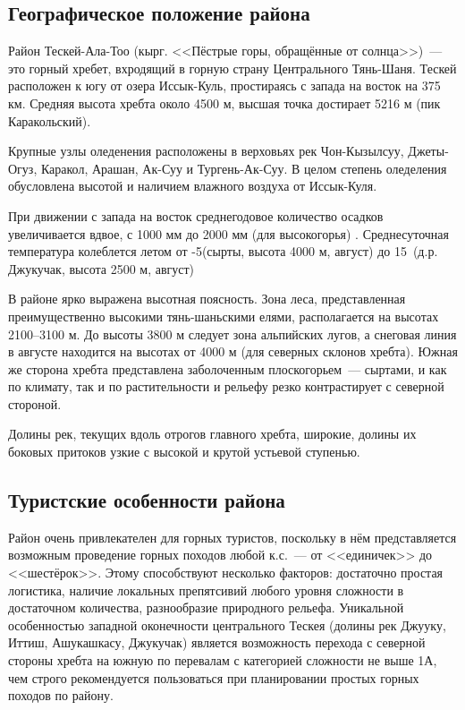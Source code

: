 \clearpage

\subsection{Географическое положение района}

Район Тескей-Ала-Тоо (кырг. <<Пёстрые горы, обращённые от солнца>>)~--- это горный хребет, вхродящий в горную страну Центрального Тянь-Шаня. Тескей расположен к югу от озера Иссык-Куль, простираясь с запада на восток на 375 км. Средняя высота хребта около 4500 м, высшая точка достирает 5216 м (пик Каракольский).

Крупные узлы оледенения расположены в верховьях рек Чон-Кызылсуу, Джеты-Огуз, Каракол, Арашан, Ак-Суу и Тургень-Ак-Суу. В целом степень оледеления обусловлена высотой и наличием влажного воздуха от Иссык-Куля.

При движении с запада на восток среднегодовое количество осадков увеличивается вдвое, с 1000 мм до 2000 мм (для высокогорья) \cite{rodina2012}. Среднесуточная температура колеблется летом от -5\degree (сырты, высота 4000 м, август) до 15\degree~(д.р. Джукучак, высота 2500 м, август)

В районе ярко выражена высотная поясность. Зона леса, представленная преимущественно высокими тянь-шаньскими елями, располагается на высотах 2100--3100 м. До высоты 3800 м следует зона альпийских лугов, а снеговая линия в августе находится на высотах от 4000 м (для северных склонов хребта). Южная же сторона хребта представлена заболоченным плоскогорьем~--- сыртами, и как по климату, так и по растительности и рельефу резко контрастирует с северной стороной.

Долины рек, текущих вдоль отрогов главного хребта, широкие, долины их боковых притоков узкие с высокой и крутой устьевой ступенью.

\subsection{Туристские особенности района}
Район очень привлекателен для горных туристов, поскольку в нём представляется возможным проведение горных походов любой к.с.~--- от <<единичек>> до <<шестёрок>>. Этому способствуют несколько факторов: достаточно простая логистика, наличие локальных препятсивий любого уровня сложности в достаточном количества, разнообразие природного рельефа. Уникальной особенностью западной оконечности центрального Тескея (долины рек Джууку, Иттиш, Ашукашкасу, Джукучак) является возможность перехода с северной стороны хребта на южную по перевалам с категорией сложности не выше 1А, чем строго рекомендуется пользоваться при планировании простых горных походов по району.

